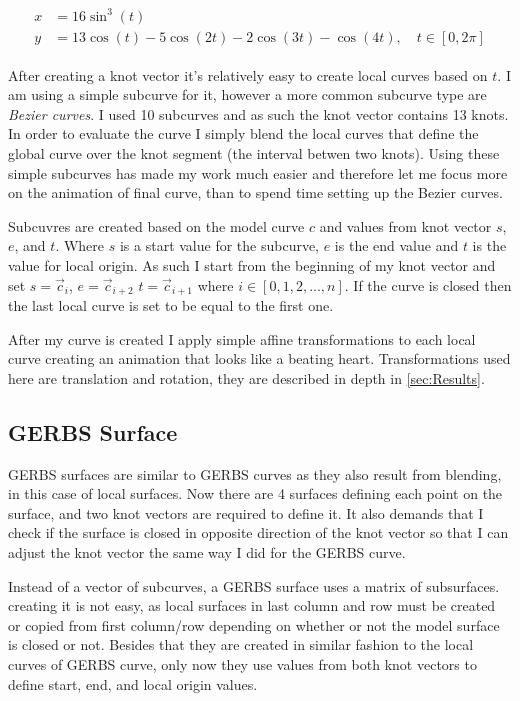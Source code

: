 \documentclass[a4paper,12pt]{extarticle}
\begin{document}
\begin{align}
\begin{split}
x &= 16 \sin^3(t) \\
y &= 13 \cos(t) - 5 \cos(2t) - 2 \cos(3t) - \cos(4t), \quad t \in [0,2\pi]
\label{eq:HeartCurve}
\end{split}
\end{align}

After creating a knot vector it's relatively easy to create local curves based on $t$. I am using a simple subcurve for it, however a more common subcurve type are \emph{Bezier curves}. I used 10 subcurves and as such the knot vector contains 13 knots. In order to evaluate the curve I simply blend the local curves that define the global curve over the knot segment (the interval betwen two knots). Using these simple subcurves has made my work much easier and therefore let me focus more on the animation of final curve, than to spend time setting up the Bezier curves.

Subcuvres are created based on the model curve $c$ and values from knot vector $s$, $e$, and $t$. Where $s$ is a start value for the subcurve, $e$ is the end value and $t$ is the value for local origin. As such I start from the beginning of my knot vector and set $s = \vec{c}_{i}$, $e = \vec{c}_{i+2}$ $t = \vec{c}_{i+1}$ where $i \in [0,1,2,...,n]$. If the curve is closed then the last local curve is set to be equal to the first one.

After my curve is created I apply simple affine transformations to each local curve creating an animation that looks like a beating heart. Transformations used here are translation and rotation, they are described in depth in \cref{sec:Results}.

\subsection{GERBS Surface}
GERBS surfaces are similar to GERBS curves as they also result from blending, in this case of local surfaces. Now there are 4 surfaces defining each point on the surface, and two knot vectors are required to define it. It also demands that I check if the surface is closed in opposite direction of the knot vector so that I can adjust the knot vector the same way I did for the GERBS curve. 

Instead of a vector of subcurves, a GERBS surface uses a matrix of subsurfaces. creating it is not easy, as local surfaces in last column and row must be created or copied from first column/row depending on whether or not the model surface is closed or not. Besides that they are created in similar fashion to the local curves of GERBS curve, only now they use values from both knot vectors to define start, end, and local origin values.
\end{document}
